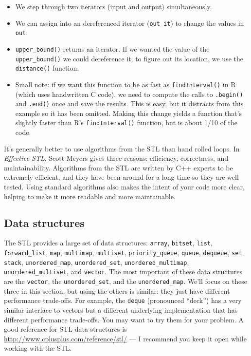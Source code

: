 \begin{itemize}
\item
  We step through two iterators (input and output) simultaneously.
\item
  We can assign into an dereferenced iterator (\texttt{out\_it}) to
  change the values in \texttt{out}.
\item
  \texttt{upper\_bound()} returns an iterator. If we wanted the value of
  the \texttt{upper\_bound()} we could dereference it; to figure out its
  location, we use the \texttt{distance()} function.
\item
  Small note: if we want this function to be as fast as
  \texttt{findInterval()} in R (which uses handwritten C code), we need
  to compute the calls to \texttt{.begin()} and \texttt{.end()} once and
  save the results. This is easy, but it distracts from this example so
  it has been omitted. Making this change yields a function that's
  slightly faster than R's \texttt{findInterval()} function, but is
  about 1/10 of the code.
\end{itemize}

It's generally better to use algorithms from the STL than hand rolled
loops. In \emph{Effective STL}, Scott Meyers gives three reasons:
efficiency, correctness, and maintainability. Algorithms from the STL
are written by C++ experts to be extremely efficient, and they have been
around for a long time so they are well tested. Using standard
algorithms also makes the intent of your code more clear, helping to
make it more readable and more maintainable.

\hypertarget{data-structures-rcpp}{%
\subsection{Data structures}\label{data-structures-rcpp}}

The STL provides a large set of data structures: \texttt{array},
\texttt{bitset}, \texttt{list}, \texttt{forward\_list}, \texttt{map},
\texttt{multimap}, \texttt{multiset}, \texttt{priority\_queue},
\texttt{queue}, \texttt{dequeue}, \texttt{set}, \texttt{stack},
\texttt{unordered\_map}, \texttt{unordered\_set},
\texttt{unordered\_multimap}, \texttt{unordered\_multiset}, and
\texttt{vector}. The most important of these data structures are the
\texttt{vector}, the \texttt{unordered\_set}, and the
\texttt{unordered\_map}. We'll focus on these three in this section, but
using the others is similar: they just have different performance
trade-offs. For example, the \texttt{deque} (pronounced ``deck'') has a
very similar interface to vectors but a different underlying
implementation that has different performance trade-offs. You may want
to try them for your problem. A good reference for STL data structures
is \url{http://www.cplusplus.com/reference/stl/} --- I recommend you
keep it open while working with the STL.

